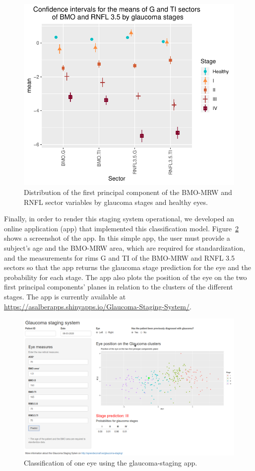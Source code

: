 \documentclass[jcm,article,submit,moreauthors,pdftex]{Definitions/mdpi}
\begin{document}
\begin{figure}[ht]
\centering
\includegraphics[width=0.5\linewidth]{img/confidence-intervals-bmo-35-G-TI-stages.pdf}
\caption{Distribution of the first principal component of the BMO-MRW and RNFL sector variables by glaucoma stages and healthy eyes.}
\label{fig:confidence-intervals}
\end{figure}

Finally, in order to render this staging system operational, we developed an online application (app) that implemented this classification model. Figure~\ref{fig:glaucoma-app} shows a screenshot of the app. In this simple app, the user must provide a subject’s age and the BMO-MRW area, which are required for standardization, and the measurements for rims G and TI of the BMO-MRW and RNFL 3.5 sectors so that the app returns the glaucoma stage prediction for the eye and the probability for each stage. The app also plots the position of the eye on the two first principal components’ planes in relation to the clusters of the different stages. The app is currently available at \url{https://asalberapps.shinyapps.io/Glaucoma-Staging-System/}.

\begin{figure}[ht]
\centering
\includegraphics[width=0.9\linewidth]{img/glaucoma-staging-app.png}
\caption{Classification of one eye using the glaucoma-staging app.}
\label{fig:glaucoma-app}
\end{figure}
\end{document}
